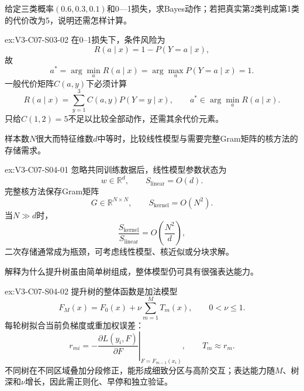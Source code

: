 \begin{SLChapterExercisePairSection}
\begin{exercise}\label{ex:V3-C07-S03-02}
给定三类概率$(0.6,0.3,0.1)$和0—1损失，求Bayes动作；若把真实第2类判成第1类的代价改为5，说明还需怎样计算。
\end{exercise}
\ifSLFullEdition
{}\label{sol:V3-C07-S03-02}
\begin{chapterexercisesolution}{ex:V3-C07-S03-02}
在0--1损失下，条件风险为
\[
R(a\mid x)=1-P(Y=a\mid x),
\]
故
\[
a^*=\arg\min_aR(a\mid x)
=\arg\max_aP(Y=a\mid x)=1.
\]
一般代价矩阵$C(a,y)$下必须计算
\[
R(a\mid x)=\sum_{y=1}^{3}C(a,y)P(Y=y\mid x),
\qquad
a^*\in\arg\min_aR(a\mid x).
\]
只给$C(1,2)=5$不足以比较全部动作，还需其余代价元素。
\end{chapterexercisesolution}
\fi

\begin{exercise}\label{ex:V3-C07-S04-01}
样本数$N$很大而特征维数$d$中等时，比较线性模型与需要完整Gram矩阵的核方法的存储需求。
\end{exercise}
\ifSLFullEdition
{}\label{sol:V3-C07-S04-01}
\begin{chapterexercisesolution}{ex:V3-C07-S04-01}
忽略共同训练数据后，线性模型参数状态为
\[
w\in\mathbb R^d,
\qquad
S_{\mathrm{linear}}=O(d).
\]
完整核方法保存Gram矩阵
\[
G\in\mathbb R^{N\times N},
\qquad
S_{\mathrm{kernel}}=O(N^2).
\]
当$N\gg d$时，
\[
\frac{S_{\mathrm{kernel}}}{S_{\mathrm{linear}}}
=O\!\left(\frac{N^2}{d}\right),
\]
二次存储通常成为瓶颈，可考虑线性模型、核近似或分块求解。
\end{chapterexercisesolution}
\fi

\begin{exercise}\label{ex:V3-C07-S04-02}
解释为什么提升树虽由简单树组成，整体模型仍可具有很强表达能力。
\end{exercise}
\ifSLFullEdition
{}\label{sol:V3-C07-S04-02}
\begin{chapterexercisesolution}{ex:V3-C07-S04-02}
提升树的整体函数是加法模型
\[
F_M(x)=F_0(x)+\nu\sum_{m=1}^{M}T_m(x),
\qquad 0<\nu\leq1.
\]
每轮树拟合当前负梯度或重加权误差：
\[
r_{mi}=-\left.\frac{\partial L(y_i,F)}{\partial F}\right|_{F=F_{m-1}(x_i)},
\qquad
T_m\approx r_m.
\]
不同树在不同区域叠加分段修正，能形成细致分区与高阶交互；表达能力随$M$、树深和$\nu$增长，因此需正则化、早停和独立验证。
\end{chapterexercisesolution}
\fi


\end{SLChapterExercisePairSection}
